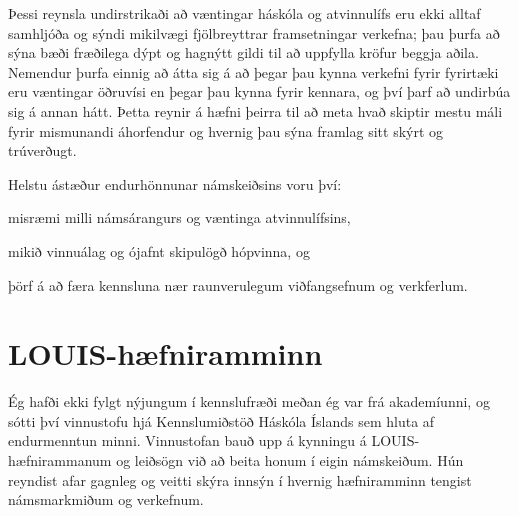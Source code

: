 \documentclass{article}
\begin{document}
Þessi reynsla undirstrikaði að væntingar háskóla og atvinnulífs eru ekki alltaf samhljóða og sýndi mikilvægi fjölbreyttrar framsetningar verkefna; þau þurfa að sýna bæði fræðilega dýpt og hagnýtt gildi til að uppfylla kröfur beggja aðila. Nemendur þurfa einnig að átta sig á að þegar þau kynna verkefni fyrir fyrirtæki eru væntingar öðruvísi en þegar þau kynna fyrir kennara, og því þarf að undirbúa sig á annan hátt. Þetta reynir á hæfni þeirra til að meta hvað skiptir mestu máli fyrir mismunandi áhorfendur og hvernig þau sýna framlag sitt skýrt og trúverðugt.

Helstu ástæður endurhönnunar námskeiðsins voru því:
\begin{enumerate*}
    \item misræmi milli námsárangurs og væntinga atvinnulífsins,
    \item mikið vinnuálag og ójafnt skipulögð hópvinna, og
    \item þörf á að færa kennsluna nær raunverulegum viðfangsefnum og verkferlum.
\end{enumerate*}

\section*{LOUIS-hæfniramminn}
Ég hafði ekki fylgt nýjungum í kennslufræði meðan ég var frá akademíunni, og sótti því vinnustofu hjá Kennslumiðstöð Háskóla Íslands sem hluta af endurmenntun minni. Vinnustofan bauð upp á kynningu á LOUIS-hæfnirammanum og leiðsögn við að beita honum í eigin námskeiðum. Hún reyndist afar gagnleg og veitti skýra innsýn í hvernig hæfniramminn tengist námsmarkmiðum og verkefnum. 
\end{document}

